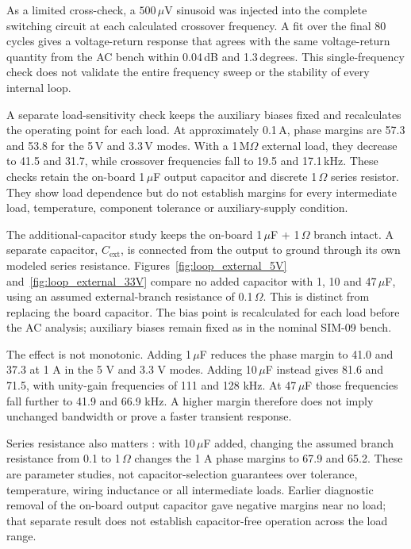 \documentclass[conference]{IEEEtran}
\begin{document}
As a limited cross-check, a \(500\,\mu\mathrm{V}\) sinusoid
was injected into the complete switching circuit at each calculated
crossover frequency. A fit over the final 80 cycles gives a
voltage-return response that agrees with the
same voltage-return quantity from the AC bench within
0.04\,dB and 1.3\,degrees. This single-frequency
check does not validate the entire frequency sweep or the stability
of every internal loop.

A separate load-sensitivity check keeps the auxiliary biases fixed
and recalculates the operating point for each load. At approximately
0.1\,A, phase margins are 57.3\textdegree{} and 53.8\textdegree{}
for the 5\,V and 3.3\,V modes. With a 1\,M$\Omega$ external load,
they decrease to 41.5\textdegree{} and 31.7\textdegree{}, while
crossover frequencies fall to 19.5 and 17.1\,kHz. These checks retain
the on-board 1\,$\mu$F output capacitor and discrete 1\,$\Omega$ series resistor. They show
load dependence but do not establish margins for every intermediate
load, temperature, component tolerance or auxiliary-supply condition.


The additional-capacitor study keeps the on-board 1\,$\mu$F +
1\,$\Omega$ branch intact. A separate capacitor, $C_{\mathrm{ext}}$,
is connected from the output to ground through its own modeled
series resistance. Figures~\ref{fig:loop_external_5V}
and~\ref{fig:loop_external_33V} compare no added capacitor with
1, 10 and 47\,$\mu$F, using an assumed external-branch resistance
of 0.1\,$\Omega$. This is distinct from replacing the board capacitor.
The bias point is recalculated for each load before the AC analysis;
auxiliary biases remain fixed as in the nominal SIM-09 bench.

The effect is not monotonic. Adding 1\,$\mu$F reduces the phase
margin to 41.0\textdegree{} and 37.3\textdegree{} at 1 A in the
5 V and 3.3 V modes. Adding 10\,$\mu$F instead gives
81.6\textdegree{} and 71.5\textdegree{}, with unity-gain
frequencies of 111 and 128 kHz. At 47\,$\mu$F those frequencies
fall further to 41.9 and 66.9 kHz. A higher margin therefore does
not imply unchanged bandwidth or prove a faster transient response.

Series resistance also matters \cite{ti_esr_stability_2020}:
with 10\,$\mu$F added, changing the assumed branch resistance
from 0.1 to 1\,$\Omega$ changes the 1 A phase margins to
67.9\textdegree{} and 65.2\textdegree{}. These are parameter
studies, not capacitor-selection guarantees over tolerance,
temperature, wiring inductance or all intermediate loads.
Earlier diagnostic removal of the on-board output capacitor gave
negative margins near no load; that separate result does not
establish capacitor-free operation across the load range.
\end{document}
